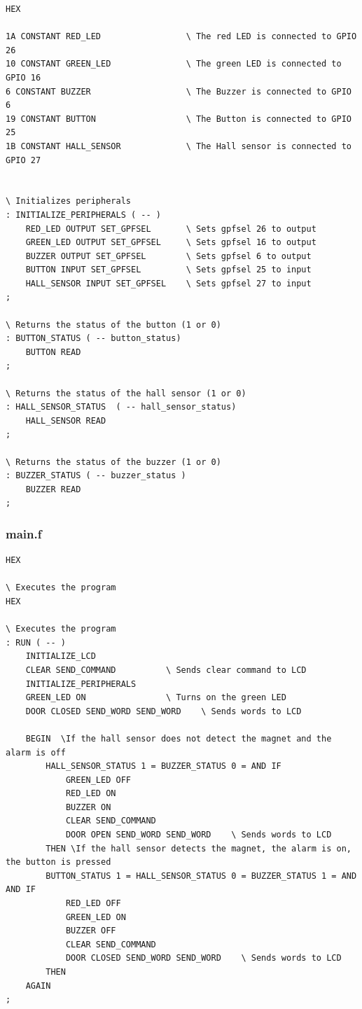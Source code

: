 \documentclass[]{article}
\begin{document}
\begin{verbatim}
HEX

1A CONSTANT RED_LED                 \ The red LED is connected to GPIO 26
10 CONSTANT GREEN_LED               \ The green LED is connected to GPIO 16
6 CONSTANT BUZZER                   \ The Buzzer is connected to GPIO 6
19 CONSTANT BUTTON                  \ The Button is connected to GPIO 25
1B CONSTANT HALL_SENSOR             \ The Hall sensor is connected to GPIO 27


\ Initializes peripherals 
: INITIALIZE_PERIPHERALS ( -- )
    RED_LED OUTPUT SET_GPFSEL       \ Sets gpfsel 26 to output 
    GREEN_LED OUTPUT SET_GPFSEL     \ Sets gpfsel 16 to output 
    BUZZER OUTPUT SET_GPFSEL        \ Sets gpfsel 6 to output 
    BUTTON INPUT SET_GPFSEL         \ Sets gpfsel 25 to input 
    HALL_SENSOR INPUT SET_GPFSEL    \ Sets gpfsel 27 to input 
;

\ Returns the status of the button (1 or 0)
: BUTTON_STATUS ( -- button_status)
    BUTTON READ 
;

\ Returns the status of the hall sensor (1 or 0)
: HALL_SENSOR_STATUS  ( -- hall_sensor_status)
    HALL_SENSOR READ
;

\ Returns the status of the buzzer (1 or 0)
: BUZZER_STATUS ( -- buzzer_status )
    BUZZER READ
;
\end{verbatim}

\subsubsection{main.f}

\begin{verbatim}
HEX

\ Executes the program
HEX

\ Executes the program
: RUN ( -- )
    INITIALIZE_LCD
    CLEAR SEND_COMMAND          \ Sends clear command to LCD
    INITIALIZE_PERIPHERALS      
    GREEN_LED ON                \ Turns on the green LED
    DOOR CLOSED SEND_WORD SEND_WORD    \ Sends words to LCD
    
    BEGIN  \If the hall sensor does not detect the magnet and the alarm is off
        HALL_SENSOR_STATUS 1 = BUZZER_STATUS 0 = AND IF   
            GREEN_LED OFF       
            RED_LED ON 
            BUZZER ON
            CLEAR SEND_COMMAND
            DOOR OPEN SEND_WORD SEND_WORD    \ Sends words to LCD
        THEN \If the hall sensor detects the magnet, the alarm is on, the button is pressed  
        BUTTON_STATUS 1 = HALL_SENSOR_STATUS 0 = BUZZER_STATUS 1 = AND AND IF
            RED_LED OFF             
            GREEN_LED ON 
            BUZZER OFF
            CLEAR SEND_COMMAND
            DOOR CLOSED SEND_WORD SEND_WORD    \ Sends words to LCD
        THEN
    AGAIN
;

\end{verbatim}
\end{document}
